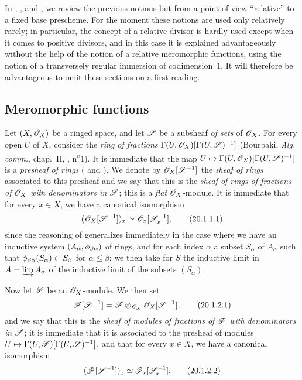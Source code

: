 In , , and , we review the previous notions but from a point of view ``relative'' to a fixed base prescheme.
For the moment these notions are used only relatively rarely; in particular, the concept of a relative divisor is hardly used except when it comes to positive divisors, and in this case it is explained advantageously without the help of the notion of a relative meromorphic functions, using the notion of a transversely regular immersion of codimension~$1$.
It will therefore be advantageous to omit these sections on a first reading.

\subsection{Meromorphic functions}
\label{IV.20.1}

\begin{env}[20.1.1]
\label{IV.20.1.1}
Let $(X,\mathscr{O}_X)$ be a ringed space, and let $\mathscr{S}$ be a subsheaf \emph{of sets} of $\mathscr{O}_X$.
For every open $U$ of $X$, consider the \emph{ring of fractions} $\Gamma(U,\mathscr{O}_X)[\Gamma(U,\mathscr{S})^{-1}]$ (Bourbaki, \emph{Alg. comm.}, chap.~II, , n\textsuperscript{o}1).
It is immediate that the map $U\mapsto\Gamma(U,\sh{O}_X)[\Gamma(U,\sh{S})^{-1}]$ is a \emph{presheaf of rings} ( and ).
We denote by $\mathscr{O}_X[\mathscr{S}^{-1}]$ the \emph{sheaf of rings} associated to this presheaf and we say that this is the \emph{sheaf of rings of fractions of $\mathscr{O}_X$ with denominators in $\mathscr{S}$};
this is a \emph{flat} $\mathscr{O}_X$-module.
It is immediate that for every $x\in X$, we have a canonical isomorphism
\[
\label{IV.20.1.1.1}
  (\mathscr{O}_X[\mathscr{S}^{-1}])_x\simeq\mathscr{O}_x[\mathscr{S}_x^{-1}],
  \tag{20.1.1.1}
\]
since the reasoning of  generalizes immediately in the case where we have an inductive system $(A_\alpha,\phi_{\beta\alpha})$ of rings, and for each index $\alpha$ a subset $S_\alpha$ of $A_\alpha$ such that
$\phi_{\beta\alpha}(S_\alpha)\subset S_\beta$ for $\alpha\leq\beta$;
we then take for $S$ the inductive limit in $A=\varinjlim A_\alpha$ of the inductive limit of the subsets $(S_\alpha)$.
\end{env}

\begin{env}[20.1.2]
Now let $\mathscr{F}$ be an $\mathscr{O}_X$-module.
We then set
\[
\label{IV.20.1.2.1}
  \mathscr{F}[\mathscr{S}^{-1}]=\mathscr{F}\otimes_{\mathscr{O}_X}\mathscr{O}_X[\mathscr{S}^{-1}],
  \tag{20.1.2.1}
\]
and we say that this is the \emph{sheaf of modules of fractions of $\mathscr{F}$ with denominators in $\mathscr{S}$};
it is immediate that it is associated to the presheaf of modules $U\mapsto\Gamma(U,\sh{F})[\Gamma(U,\sh{S})^{-1}]$, and that for every $x\in X$, we have a canonical isomorphism
\[
\label{IV.20.1.2.2}
  (\mathscr{F}[\mathscr{S}^{-1}])_x\simeq\mathscr{F}_x[\mathscr{S}_x^{-1}].
  \tag{20.1.2.2}
\]
\end{env}

